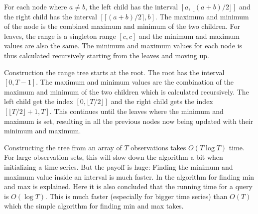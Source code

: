 For each node where $a \neq b$, the left child has the interval $[a, \lfloor
(a+b)/2 \rfloor]$ and the right child has the interval $[\lceil
(a+b)/2 \rceil, b]$. The maximum and minimum of the node is the combined maximum
and minimum of the two children. For leaves, the range is a singleton range
$[c,c]$ and the minimum and maximum values are also the same. The minimum and
maximum values for each node is thus calculated recursively starting from the
leaves and moving up. 

Construction the range tree starts at the root. The root has the interval
$[0,T-1]$. The maximum and minimum values are the combination of the maximum and
minimum of the two children which is calculated recursively. The left child get
the index $[0, \lfloor T/2 \rfloor]$ and the right child gets the index $[\lfloor
T/2 \rfloor + 1, T ]$. This
continues until the leaves where the minimum and maximum is set, resulting in
all the previous nodes now being updated with their minimum and maximum. 

Constructing the tree from an array of $T$ observations takes 
$O(T \log T)$ time. For large observation sets, this will slow down the
algorithm a bit when initializing a time series. But the payoff is huge: Finding
the minimum and maximum value inside an interval is much faster. In
\cite{compstat14} the algorithm for finding min and max is explained. Here it is
also concluded that the running time for a query is $O(\log T)$. This is much
faster (especially for bigger time series) than $O(T)$ which the simple
algorithm for finding min and max takes. 